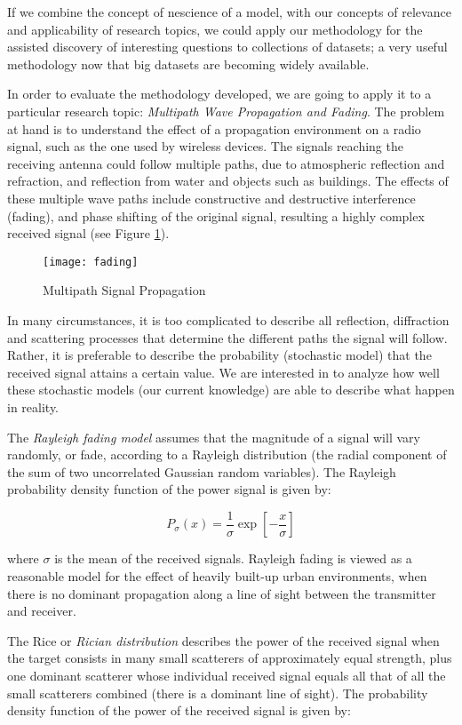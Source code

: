 If we combine the concept of nescience of a model, with our concepts of relevance and applicability of research topics, we could apply our methodology for the assisted discovery of interesting questions to collections of datasets; a very useful methodology now that big datasets are becoming widely available.

In order to evaluate the methodology developed, we are going to apply it to a particular research topic: \emph{Multipath Wave Propagation and Fading}. The problem at hand is to understand the effect of a propagation environment on a radio signal, such as the one used by wireless devices. The signals reaching the receiving antenna could follow multiple paths, due to atmospheric reflection and refraction, and reflection from water and objects such as buildings. The effects of these multiple wave paths include constructive and destructive interference (fading), and phase shifting of the original signal, resulting a highly complex received signal (see Figure \ref{fig:Multipath-Signal-Propagation}).

\begin{figure}[h]
\centering\texttt{[image: fading]}
\caption{\label{fig:Multipath-Signal-Propagation}Multipath Signal Propagation}
\end{figure}

In many circumstances, it is too complicated to describe all reflection, diffraction and scattering processes that determine the different paths the signal will follow. Rather, it is preferable to describe the probability (stochastic model) that the received signal attains a certain value. We are interested in to analyze how well these stochastic models (our current knowledge) are able to describe what happen in reality.

The \emph{Rayleigh fading model} assumes that the magnitude of a signal will vary randomly, or fade, according to a Rayleigh distribution (the radial component of the sum of two uncorrelated Gaussian random variables). The Rayleigh probability density function of the power signal is given by:

\[
P_{\sigma}\left(x\right)=\frac{1}{\sigma}\exp\left[-\frac{x}{\sigma}\right]
\]

where $\sigma$ is the mean of the received signals. Rayleigh fading is viewed as a reasonable model for the effect of heavily built-up urban environments, when there is no dominant propagation along a line of sight between the transmitter and receiver.

The Rice or \emph{Rician distribution} describes the power of the received signal when the target consists in many small scatterers of approximately equal strength, plus one dominant scatterer whose individual received signal equals all that of all the small scatterers combined (there is a dominant line of sight). The probability density function of the power of the received signal is given by:

